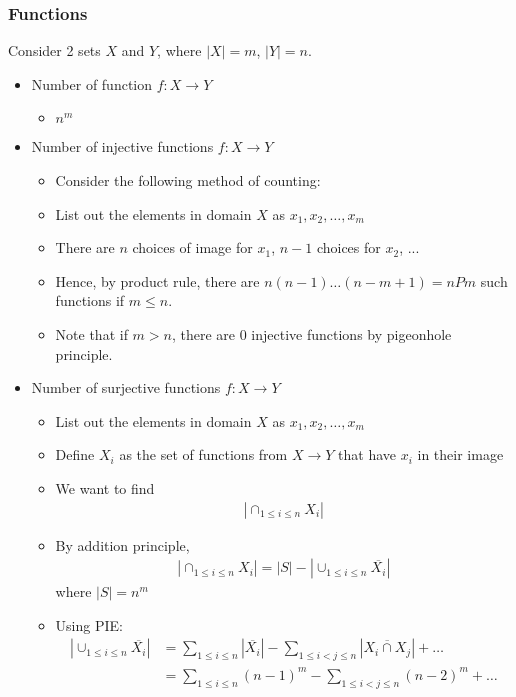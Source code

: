 \documentclass{article}
\begin{document}
\subsubsection{Functions}
Consider 2 sets $X$ and $Y$, where $|X|=m$, $|Y|=n$. 
\begin{itemize}
	\item Number of function $f:X\rightarrow Y$
	\begin{itemize}
		\item $n^m$
	\end{itemize}
	\item Number of injective functions $f: X\rightarrow Y$
	\begin{itemize}
		\item Consider the following method of counting:
		\item List out the elements in domain $X$ as $x_1,x_2,\dots,x_m$
		\item There are $n$ choices of image for $x_1$, $n-1$ choices for $x_2$, ...
		\item Hence, by product rule, there are $n(n-1)\dots(n-m+1)=nPm$ such functions if $m\leq n$.
		\item Note that if $m>n$, there are $0$ injective functions by pigeonhole principle.
	\end{itemize}
	\item Number of surjective functions $f: X\rightarrow Y$
	\begin{itemize}
		\item List out the elements in domain $X$ as $x_1,x_2,\dots,x_m$
		\item Define $X_i$ as the set of functions from $X\rightarrow Y$ that have $x_i$ in their image
		\item We want to find \begin{align*}
			|\cap_{1\leq i\leq n}X_i|
		\end{align*}
		\item By addition principle, \begin{align*}
			|\cap_{1\leq i\leq n}X_i| = |S| - |\cup_{1\leq i\leq n}\overline{X_i}|
		\end{align*}
		where $|S|=n^m$
		\item Using PIE: \begin{align*}
			|\cup_{1\leq i\leq n}\overline{X_i}|&=\sum_{1\leq i\leq n} |\overline{X_i}| - \sum_{1\leq i < j\leq n} |\overline{X_i \cap X_j}|+\dots\\
			&=\sum_{1\leq i\leq n}(n-1)^m-\sum_{1\leq i < j\leq n}(n-2)^m+\dots\\

\end{align*}
\end{itemize}
\end{itemize}
\end{document}
